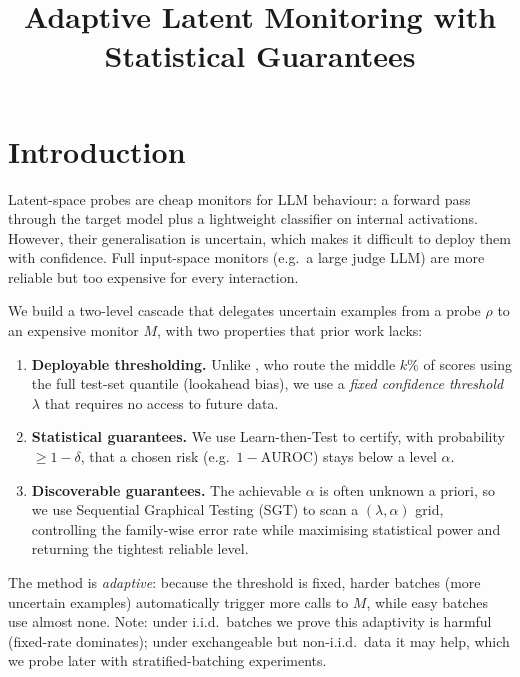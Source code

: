 \documentclass{article}
\newcommand{\probe}{\rho}
\newcommand{\monitor}{M}
\begin{document}
\title{Adaptive Latent Monitoring with Statistical Guarantees}
\maketitle


\section{Introduction}

Latent-space probes are cheap monitors for LLM behaviour: a forward pass through the target model plus a lightweight classifier on internal activations.
However, their generalisation is uncertain, which makes it difficult to deploy them with confidence.
Full input-space monitors (e.g.\ a large judge LLM) are more reliable but too expensive for every interaction.

We build a two-level cascade that delegates uncertain examples from a probe $\probe$ to an expensive monitor $\monitor$, with two properties that prior work lacks:
\begin{enumerate}
    \item \textbf{Deployable thresholding.}
    Unlike \citet{mckenzie_detecting_2025}, who route the middle $k\%$ of scores using the full test-set quantile (lookahead bias), we use a \emph{fixed confidence threshold} $\lambda$ that requires no access to future data.
    \item \textbf{Statistical guarantees.}
    We use Learn-then-Test \citep[LTT;][]{angelopoulos_learn_2022} to certify, with probability $\geq 1-\delta$, that a chosen risk (e.g.\ $1 - \text{AUROC}$) stays below a level $\alpha$.
    \item \textbf{Discoverable guarantees.}
    The achievable $\alpha$ is often unknown a priori, so we use Sequential Graphical Testing (SGT) to scan a $(\lambda, \alpha)$ grid, controlling the family-wise error rate while maximising statistical power and returning the tightest reliable level.
\end{enumerate}

The method is \emph{adaptive}: because the threshold is fixed, harder batches (more uncertain examples) automatically trigger more calls to $\monitor$, while easy batches use almost none.
Note: under i.i.d.\ batches we prove this adaptivity is harmful (fixed-rate dominates); under exchangeable but non-i.i.d.\ data it may help, which we probe later with stratified-batching experiments.
\end{document}
